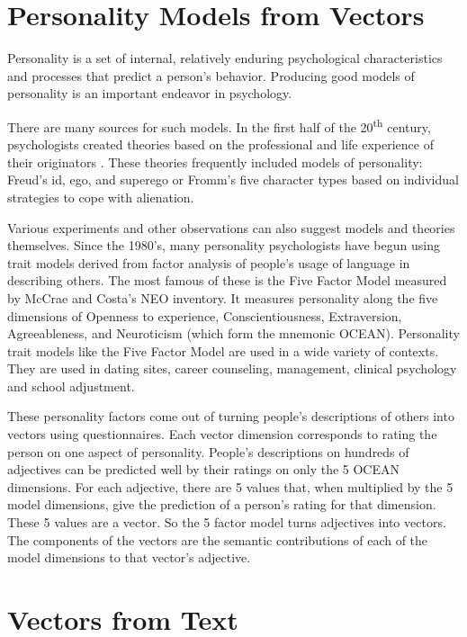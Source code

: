\documentclass[eric_thesis.tex]{subfiles}
\begin{document}
\section{Personality Models from Vectors}

Personality is a set of internal, relatively enduring psychological 
characteristics and processes that predict a person's behavior. Producing good
models of personality is an important endeavor in psychology.

There are many sources for such models. In the first half of the 
20\textsuperscript{th} century, psychologists created theories based on the
professional and life experience of their originators 
. These theories frequently included models of
personality: Freud's id, ego, and superego or Fromm's five character types based 
on individual strategies to cope with alienation.

Various experiments and other observations can also suggest models and theories
themselves. Since the 1980's, many personality psychologists have begun using 
trait models derived from factor analysis of people's usage of language in 
describing others. The most famous of these is the Five Factor Model measured by 
McCrae and Costa's NEO inventory. It measures personality along the five 
dimensions of Openness to experience, Conscientiousness, Extraversion, 
Agreeableness, and Neuroticism (which form the mnemonic OCEAN). Personality 
trait models like the Five Factor Model are used in a wide variety of contexts. 
They are used in dating sites, career counseling, management, clinical 
psychology and school adjustment.

These personality factors come out of turning people's descriptions of others 
into vectors using questionnaires. Each vector dimension corresponds to rating 
the person on one aspect of personality. People's descriptions on hundreds of 
adjectives can be predicted well by their ratings on only the 5 OCEAN 
dimensions. For each adjective, there are 5 values that, when multiplied by the 
5 model dimensions, give the prediction of a person's rating for that dimension. 
These 5 values are a vector. So the 5 factor model turns adjectives into 
vectors. The components of the vectors are the semantic contributions of each of 
the model dimensions to that vector's adjective.

\section{Vectors from Text}
\end{document}
